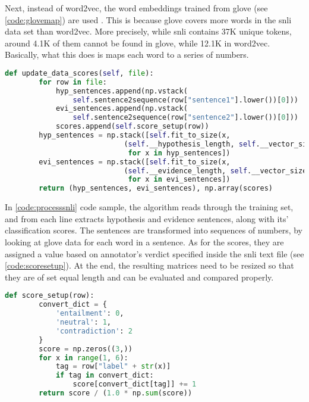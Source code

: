             Next, instead of word2vec, the word embeddings trained from \gls{glove} (see \cref{code:glovemap}) are used \autocite{Pennington2014GloveGV}. This is because \gls{glove} covers more words in the \gls{snli} data set than word2vec. More precisely, while \gls{snli} contains 37K unique tokens, around 4.1K of them cannot be found in \gls{glove}, while 12.1K in word2vec. Basically, what this does is maps each word to a series of numbers.
            
            \begin{lstlisting}[language=Python, caption=Processing SNLI Data Set, label=code:processsnli]
    def update_data_scores(self, file):
        for row in file:
            hyp_sentences.append(np.vstack(
                self.sentence2sequence(row["sentence1"].lower())[0]))
            evi_sentences.append(np.vstack(
                self.sentence2sequence(row["sentence2"].lower())[0]))
            scores.append(self.score_setup(row))
        hyp_sentences = np.stack([self.fit_to_size(x, 
                            (self.__hypothesis_length, self.__vector_size))
                             for x in hyp_sentences])
        evi_sentences = np.stack([self.fit_to_size(x, 
                            (self.__evidence_length, self.__vector_size))
                             for x in evi_sentences])
        return (hyp_sentences, evi_sentences), np.array(scores)
            \end{lstlisting}
            \FloatBarrier
            
            In \cref{code:processsnli} code sample, the algorithm reads through the training set, and from each line extracts hypothesis and evidence sentences, along with its' classification scores. The sentences are transformed into sequences of numbers, by looking at \gls{glove} data for each word in a sentence. As for the scores, they are assigned a value based on annotator's verdict specified inside the \gls{snli} text file (see \cref{code:scoresetup}). At the end, the resulting matrices need to be resized so that they are of set equal length and can be evaluated and compared properly.
            
            \begin{lstlisting}[language=Python, caption=Classification Score Setup, label=code:scoresetup]
    def score_setup(row):
        convert_dict = {
            'entailment': 0,
            'neutral': 1,
            'contradiction': 2
        }
        score = np.zeros((3,))
        for x in range(1, 6):
            tag = row["label" + str(x)]
            if tag in convert_dict:
                score[convert_dict[tag]] += 1
        return score / (1.0 * np.sum(score))
            \end{lstlisting}
            \FloatBarrier
            
